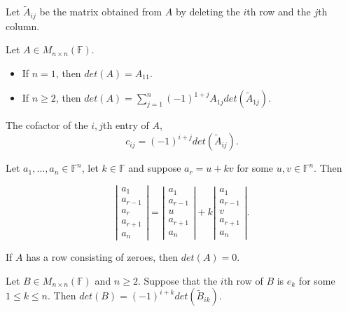 \documentclass[12pt]{article}
\newenvironment{lemma}[2][Lemma]{\begin{trivlist}
\item[\hskip \labelsep {\bfseries #1}\hskip \labelsep {\bfseries #2.}]}{\end{trivlist}}
\newenvironment{theorem}[2][Theorem]{\begin{trivlist}
\item[\hskip \labelsep {\bfseries #1}\hskip \labelsep {\bfseries #2.}]}{\end{trivlist}}
\newenvironment{corollary}[2][Corollary]{\begin{trivlist}
\item[\hskip \labelsep {\bfseries #1}\hskip \labelsep {\bfseries #2}]}{\end{trivlist}}
\newenvironment{definition}[2][Definition]{\begin{trivlist}
\item[\hskip \labelsep {\bfseries #1}\hskip \labelsep {\bfseries #2}]}{\end{trivlist}}
\begin{document}
Let $\tilde{A}_{ij}$ be the matrix obtained from $A$ by deleting the $i$th row and the $j$th column.

\begin{definition}{2}
Let $A \in M_{n \times n}(\mathbb{F})$.

\begin{itemize}
    \item If $n = 1$, then $det(A) = A_{11}$.
    
    \item If $n \geq 2$, then $det(A) = \sum_{j = 1}^n(-1)^{1 + j}A_{1j}det(\tilde{A}_{1j})$.
\end{itemize}
\end{definition}

\noindent The cofactor of the $i,j$th entry of $A$, $$c_{ij} = (-1)^{i + j}det(\tilde{A}_{ij}).$$

\begin{theorem}{4.3}
Let $a_1, \dots, a_n \in \mathbb{F}^n$, let $k \in \mathbb{F}$ and suppose $a_r = u + kv$ for some $u, v \in \mathbb{F}^n$. Then

$$\left| \begin{array}{c}
     a_1 \\ a_{r-1} \\ a_r \\ a_{r+1} \\ a_n
\end{array} \right| = \left| \begin{array}{c}
     a_1 \\ a_{r-1} \\ u \\ a_{r+1} \\ a_n
\end{array} \right| + k\left| \begin{array}{c}
     a_1 \\ a_{r-1} \\ v \\ a_{r+1} \\ a_n
\end{array} \right|.$$
\end{theorem}

\begin{corollary}{4}
If $A$ has a row consisting of zeroes, then $det(A) = 0$.
\end{corollary}

\begin{lemma}{5}
Let $B \in M_{n \times n}(\mathbb{F})$ and $n \geq 2$. Suppose that the $i$th row of $B$ is $e_k$ for some $1 \leq k \leq n$. Then $det(B) = (-1)^{i + k}det(\tilde{B}_{ik})$.
\end{lemma}
\end{document}
